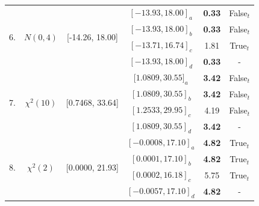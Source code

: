 \documentclass[a4paper,fleqn]{cas-dc}
\begin{document}
\begin{table}[h!]
\begin{threeparttable}
\begin{tabular}{|c|c|c|c|c|c|}
\hline
\multirow{4}{*}{6.} & \multirow{4}{*}{$N(0 ,4)$}&\multirow{4}{*}{[-14.26, 18.00]} & $[-13.93, 18.00]_a$& 
    \bf{0.33} & False$_t$\\
    &&&$[-13.93, 18.00]_b$ & \bf{0.33} & False$_t$\\
    &&&$[-13.71, 16.74]_c$ & 1.81      & True$_t$\\
    &&&$[-13.93, 18.00]_d$ & \bf{0.33} & - \\    

\hline
\multirow{4}{*}{7.} & \multirow{4}{*}{$\chi^2(10)$}&\multirow{4}{*}{[0.7468, 33.64]} & [$1.0809, 30.55]_a$& 
    \bf{3.42} & False$_t$\\
    &&&$[1.0809, 30.55]_b$ & \bf{3.42} & False$_t$\\
    &&&$[1.2533, 29.95]_c$ & 4.19      & False$_t$\\
    &&&$[1.0809, 30.55]_d$ & \bf{3.42} &  - \\    

\hline
\multirow{4}{*}{8.} & \multirow{4}{*}{$\chi^2(2)$}&\multirow{4}{*}{[0.0000, 21.93]} & $[-0.0008, 17.10]_a$& 
    \bf{4.82} & True$_t$\\
    &&&$[0.0001, 17.10]_b$ & \bf{4.82} & True$_t$\\
    &&&$[0.0002, 16.18]_c$ & 5.75      & True$_t$\\
    &&&$[-0.0057, 17.10]_d$ & \bf{4.82} & - \\       
    

\end{tabular}
\end{threeparttable}
\end{table}
\end{document}

